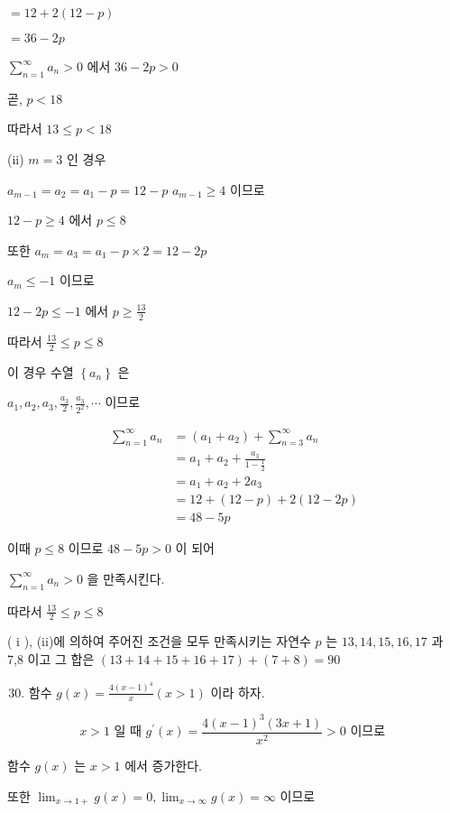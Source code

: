 \documentclass[10pt]{article}
\begin{document}
\(=12+2(12-p)\)

\(=36-2 p\)

\(\sum_{n=1}^{\infty} a_{n}>0\) 에서 \(36-2 p>0\)

곧, \(p<18\)

따라서 \(13 \leq p<18\)

(ii) \(m=3\) 인 경우

\(a_{m-1}=a_{2}=a_{1}-p=12-p\) \(a_{m-1} \geq 4\) 이므로

\(12-p \geq 4\) 에서 \(p \leq 8\)

또한 \(a_{m}=a_{3}=a_{1}-p \times 2=12-2 p\)

\(a_{m} \leq-1\) 이므로

\(12-2 p \leq-1\) 에서 \(p \geq \frac{13}{2}\)

따라서 \(\frac{13}{2} \leq p \leq 8\)

이 경우 수열 \(\left\{a_{n}\right\}\) 은

\(a_{1}, a_{2}, a_{3}, \frac{a_{3}}{2}, \frac{a_{3}}{2^{2}}, \cdots\) 이므로

\[
\begin{aligned}
\sum_{n=1}^{\infty} a_{n} & =\left(a_{1}+a_{2}\right)+\sum_{n=3}^{\infty} a_{n} \\
& =a_{1}+a_{2}+\frac{a_{3}}{1-\frac{1}{2}} \\
& =a_{1}+a_{2}+2 a_{3} \\
& =12+(12-p)+2(12-2 p) \\
& =48-5 p
\end{aligned}
\]

이때 \(p \leq 8\) 이므로 \(48-5 p>0\) 이 되어

\(\sum_{n=1}^{\infty} a_{n}>0\) 을 만족시킨다.

따라서 \(\frac{13}{2} \leq p \leq 8\)

( i ), (ii)에 의하여 주어진 조건을 모두 만족시키는 자연수 \(p\) 는 \(13,14,15,16,17\) 과 7,8 이고 그 합은 \((13+14+15+16+17)+(7+8)=90\)

\begin{enumerate}
  \setcounter{enumi}{29}
  \item 함수 \(g(x)=\frac{4(x-1)^{4}}{x}(x>1)\) 이라 하자.
\end{enumerate}

\[
x>1 \text { 일 때 } g^{\prime}(x)=\frac{4(x-1)^{3}(3 x+1)}{x^{2}}>0 \text { 이므로 }
\]

함수 \(g(x)\) 는 \(x>1\) 에서 증가한다.

또한 \(\lim _{x \rightarrow 1+} g(x)=0, \lim _{x \rightarrow \infty} g(x)=\infty\) 이므로
\end{document}
